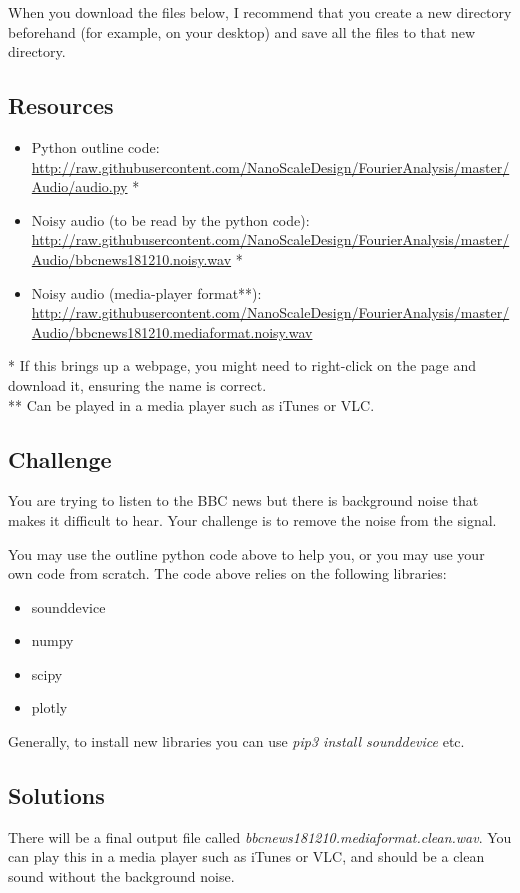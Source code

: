 When you download the files below, I recommend that you create a new directory beforehand (for example, on your desktop) and save all the files to that new directory.

\subsection*{Resources}
\begin{itemize}
    \item Python outline code: \url{http://raw.githubusercontent.com/NanoScaleDesign/FourierAnalysis/master/Audio/audio.py} *
    \item Noisy audio (to be read by the python code): \url{http://raw.githubusercontent.com/NanoScaleDesign/FourierAnalysis/master/Audio/bbcnews181210.noisy.wav} *
    \item Noisy audio (media-player format**): \url{http://raw.githubusercontent.com/NanoScaleDesign/FourierAnalysis/master/Audio/bbcnews181210.mediaformat.noisy.wav}
\end{itemize}

* If this brings up a webpage, you might need to right-click on the page and download it, ensuring the name is correct.\\
** Can be played in a media player such as iTunes or VLC.

\subsection*{Challenge}
You are trying to listen to the BBC news but there is background noise that makes it difficult to hear. Your challenge is to remove the noise from the signal.

You may use the outline python code above to help you, or you may use your own code from scratch. The code above relies on the following libraries:
\begin{itemize}
    \item sounddevice
    \item numpy
    \item scipy
    \item plotly
\end{itemize}

Generally, to install new libraries you can use \emph{pip3 install sounddevice} etc.

\subsection*{Solutions}
There will be a final output file called \emph{bbcnews181210.mediaformat.clean.wav}.
You can play this in a media player such as iTunes or VLC, and should be a clean sound without the background noise.




